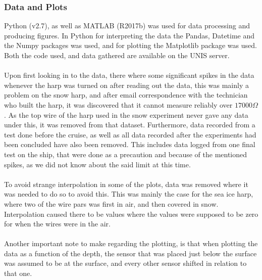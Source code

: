 \subsubsection{Data and Plots}
Python (v2.7), as well as MATLAB (R2017b) was used for data processing and producing figures. In Python for interpreting the data the Pandas, Datetime and the Numpy packages was used, and for plotting the Matplotlib package was used. Both the code used, and data gathered are available on the UNIS server.\\
\\
Upon first looking in to the data, there where some significant spikes in the data whenever the harp was turned on after reading out the data, this was mainly a problem on the snow harp, and after email correspondence with the technician who built the harp, it was discovered that it cannot measure reliably over $17000 \Omega$. As the top wire of the harp used in the snow experiment never gave any data under this, it was removed from that dataset. Furthermore, data recorded from a test done before the cruise, as well as all data recorded after the experiments had been concluded have also been removed. This includes data logged from one final test on the ship, that were done as a precaution and because of the mentioned spikes, as we did not know about the said limit at this time.\\
\\
To avoid strange interpolation in some of the plots, data was removed where it was needed to do so to avoid this. This was mainly the case for the sea ice harp, where two of the wire pars was first in air, and then covered in snow. Interpolation caused there to be values where the values were supposed to be zero for when the wires were in the air.\\ 
\\
Another important note to make regarding the plotting, is that when plotting the data as a function of the depth, the sensor that was placed just below the surface was assumed to be at the surface, and every other sensor shifted in relation to that one. 

